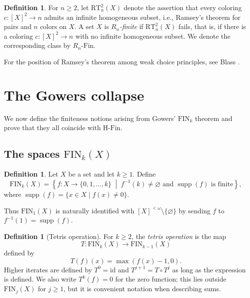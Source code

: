 \documentclass[11pt]{amsart}
\theoremstyle{definition}
\newtheorem{definition}[theorem]{Definition}
\DeclareMathOperator{\supp}{supp}
\newcommand{\HFin}{\mathrm{H\text{-}Fin}}
\newcommand{\RnFin}[1]{R_{#1}\text{-}\mathrm{Fin}}
\newcommand{\FIN}{\mathrm{FIN}}
\newcommand{\RT}{\mathrm{RT}}
\begin{document}
\begin{definition}
For \(n\geq 2\), let \(\RT^2_n(X)\) denote the assertion that every coloring \(c:[X]^2\to n\) admits an infinite homogeneous subset, i.e., Ramsey's theorem for pairs and \(n\) colors on \(X\).  A set \(X\) is \emph{\(R_n\)-finite} if \(\RT^2_n(X)\) fails, that is, if there is a coloring \(c:[X]^2\to n\) with no infinite homogeneous subset.  We denote the corresponding class by \(\RnFin{n}\).
\end{definition}

For the position of Ramsey's theorem among weak choice principles, see Blass \cite{Blass77}.

\section{The Gowers collapse}

We now define the finiteness notions arising from Gowers' \(\FIN_k\) theorem and prove that they all coincide with \(\HFin\).

\subsection{The spaces \(\FIN_k(X)\)}

\begin{definition}
Let \(X\) be a set and let \(k\geq 1\).  Define
\[
    \FIN_k(X)=
    \left\{
        f:X\to\{0,1,\dots,k\}
        \;\middle|\;
        f^{-1}(k)\neq\varnothing\text{ and }\supp(f)\text{ is finite}
    \right\},
\]
where \(\supp(f)=\{x\in X\mid f(x)\neq 0\}\).
\end{definition}

Thus \(\FIN_1(X)\) is naturally identified with \([X]^{<\omega}\setminus\{\varnothing\}\) by sending \(f\) to \(f^{-1}(1)=\supp(f)\).

\begin{definition}[Tetris operation]
For \(k\geq 2\), the \emph{tetris operation} is the map
\[
    T:\FIN_k(X)\to \FIN_{k-1}(X)
\]
defined by
\[
    T(f)(x)=\max(f(x)-1,0).
\]
Higher iterates are defined by \(T^0=\mathrm{id}\) and \(T^{j+1}=T\circ T^j\) as long as the expression is defined.  We also write \(T^k(f)=0\) for the zero function; this lies outside \(\FIN_j(X)\) for \(j\geq 1\), but it is convenient notation when describing sums.
\end{definition}
\end{document}

